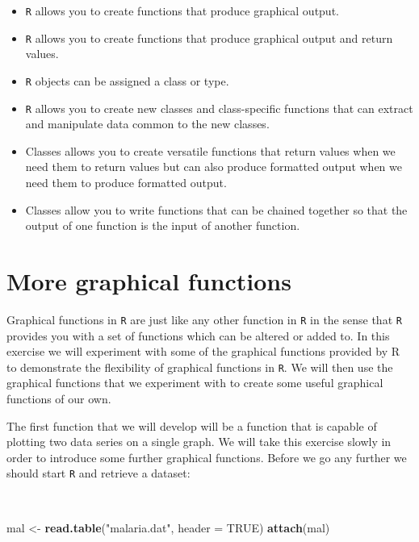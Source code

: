 \documentclass[12pt,a4paper]{book}
\newenvironment{Shaded}{\begin{snugshade}}{\end{snugshade}}
\newcommand{\KeywordTok}[1]{\textcolor[rgb]{0.13,0.29,0.53}{\textbf{#1}}}
\newcommand{\DataTypeTok}[1]{\textcolor[rgb]{0.13,0.29,0.53}{#1}}
\newcommand{\StringTok}[1]{\textcolor[rgb]{0.31,0.60,0.02}{#1}}
\newcommand{\OtherTok}[1]{\textcolor[rgb]{0.56,0.35,0.01}{#1}}
\newcommand{\NormalTok}[1]{#1}
\theoremstyle{definition}
\theoremstyle{definition}
\theoremstyle{definition}
\theoremstyle{remark}
\begin{document}
\begin{itemize}
\item
  \texttt{R} allows you to create functions that produce graphical
  output.
\item
  \texttt{R} allows you to create functions that produce graphical
  output and return values.
\item
  \texttt{R} objects can be assigned a class or type.
\item
  \texttt{R} allows you to create new classes and class-specific
  functions that can extract and manipulate data common to the new
  classes.
\item
  Classes allows you to create versatile functions that return values
  when we need them to return values but can also produce formatted
  output when we need them to produce formatted output.
\item
  Classes allow you to write functions that can be chained together so
  that the output of one function is the input of another function.
\end{itemize}

\hypertarget{exercise8}{%
\chapter{More graphical functions}\label{exercise8}}

Graphical functions in \texttt{R} are just like any other function in
\texttt{R} in the sense that \texttt{R} provides you with a set of
functions which can be altered or added to. In this exercise we will
experiment with some of the graphical functions provided by R to
demonstrate the flexibility of graphical functions in \texttt{R}. We
will then use the graphical functions that we experiment with to create
some useful graphical functions of our own.

The first function that we will develop will be a function that is
capable of plotting two data series on a single graph. We will take this
exercise slowly in order to introduce some further graphical functions.
Before we go any further we should start \texttt{R} and retrieve a
dataset:

~

\begin{Shaded}
\begin{Highlighting}[]
\NormalTok{mal <-}\StringTok{ }\KeywordTok{read.table}\NormalTok{(}\StringTok{"malaria.dat"}\NormalTok{, }\DataTypeTok{header =} \OtherTok{TRUE}\NormalTok{)}
\KeywordTok{attach}\NormalTok{(mal)}
\end{Highlighting}
\end{Shaded}
\end{document}
